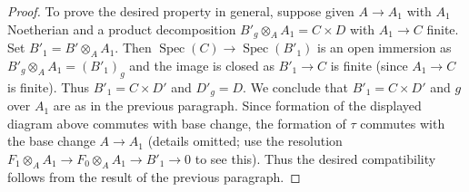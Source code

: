 \documentclass[10pt,a4paper]{amsart}
\theoremstyle{plain}
\theoremstyle{definition}
\theoremstyle{remark}
\numberwithin{equation}{subsection}
\def\Spec{\mathop{\mathrm{Spec}}}
\begin{document}
\begin{proof}
\medskip\noindent
To prove the desired property in general, suppose given
$A \to A_1$ with $A_1$ Noetherian and a product decomposition
$B'_g \otimes_A A_1 = C \times D$ with $A_1 \to C$ finite.
Set $B'_1 = B' \otimes_A A_1$. Then $\Spec(C) \to \Spec(B'_1)$
is an open immersion as $B'_g \otimes_A A_1 = (B'_1)_g$ and
the image is closed as $B'_1 \to C$ is finite (since $A_1 \to C$
is finite). Thus $B'_1 = C \times D'$ and $D'_g = D$.
We conclude that $B'_1 = C \times D'$ and $g$ over $A_1$
are as in the previous paragraph.
Since formation of the displayed diagram above
commutes with base change, the formation of $\tau$ commutes
with the base change $A \to A_1$ (details omitted; use the
resolution $F_1 \otimes_A A_1 \to F_0 \otimes_A A_1 \to B'_1 \to 0$
to see this). Thus the desired compatibility follows from the result
of the previous paragraph.
\end{proof}
\end{document}
